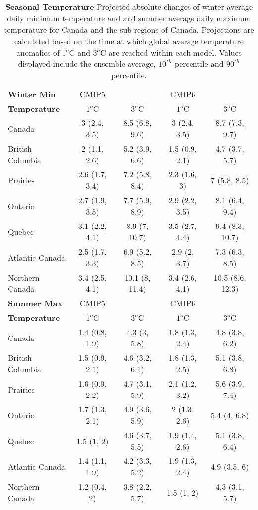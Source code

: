 \documentclass[]{scrartcl}
\begin{document}
\begin{table}[t]
	\caption{\textbf{Seasonal Temperature} Projected absolute changes of winter average daily minimum temperature and and summer average daily maximum temperature for Canada and the sub-regions of Canada. Projections are calculated based on the time at which global average temperature anomalies of $1^o$C and $3^o$C are reached within each model. Values displayed include the ensemble average, $10^{th}$ percentile and $90^{th}$ percentile.}\label{table:deg_seas_tas}
	\begin{center}
		\begin{tabularx}{\linewidth}{|L|cc|cc|} 
			\hline
			\textbf{Winter Min} & CMIP5 &  & CMIP6 &   \\
			\textbf{Temperature} & $1^o$C & $3^o$C & $1^o$C & $3^o$C \\
			\hline
			Canada & 3 (2.4, 3.5) & 8.5 (6.8, 9.6) & 3 (2.4, 3.5) & 8.7 (7.3, 9.7) \\ 
			British Columbia & 2 (1.1, 2.6) & 5.2 (3.9, 6.6) & 1.5 (0.9, 2.1) & 4.7 (3.7, 5.7) \\ 
			Prairies & 2.6 (1.7, 3.4) & 7.2 (5.8, 8.4) & 2.3 (1.6, 3) & 7 (5.8, 8.5) \\ 
			Ontario & 2.7 (1.9, 3.5) & 7.7 (5.9, 8.9) & 2.9 (2.2, 3.5) & 8.1 (6.4, 9.4) \\ 
			Quebec & 3.1 (2.2, 4.1) & 8.9 (7, 10.7) & 3.5 (2.7, 4.4) & 9.4 (8.3, 10.7) \\ 
			Atlantic Canada & 2.5 (1.7, 3.3) & 6.9 (5.2, 8.5) & 2.9 (2, 3.7) & 7.3 (6.3, 8.5) \\ 
			Northern Canada & 3.4 (2.5, 4.1) & 10.1 (8, 11.4) & 3.4 (2.6, 4.1) & 10.5 (8.6, 12.3) \\ 
			\hline
			\textbf{Summer Max} & CMIP5 &  & CMIP6 &   \\
			\textbf{Temperature} & $1^o$C & $3^o$C & $1^o$C & $3^o$C \\	
			\hline
			Canada & 1.4 (0.8, 1.9) & 4.3 (3, 5.8) & 1.8 (1.3, 2.4) & 4.8 (3.8, 6.2) \\ 
			British Columbia & 1.5 (0.9, 2.1) & 4.6 (3.2, 6.1) & 1.8 (1.3, 2.5) & 5.1 (3.8, 6.8) \\ 
			Prairies & 1.6 (0.9, 2.2) & 4.7 (3.1, 5.9) & 2.1 (1.2, 3.2) & 5.6 (3.9, 7.4) \\ 
			Ontario & 1.7 (1.3, 2.1) & 4.9 (3.6, 5.9) & 2 (1.3, 2.6) & 5.4 (4, 6.8) \\ 
			Quebec & 1.5 (1, 2) & 4.6 (3.7, 5.5) & 1.9 (1.4, 2.6) & 5.1 (3.8, 6.4) \\ 
			Atlantic Canada & 1.4 (1.1, 1.9) & 4.2 (3.3, 5.2) & 1.9 (1.3, 2.4) & 4.9 (3.5, 6) \\ 
			Northern Canada & 1.2 (0.4, 2) & 3.8 (2.2, 5.7) & 1.5 (1, 2) & 4.3 (3.1, 5.7) \\ 
			\hline	
		\end{tabularx}
	\end{center}
\end{table}
\end{document}
